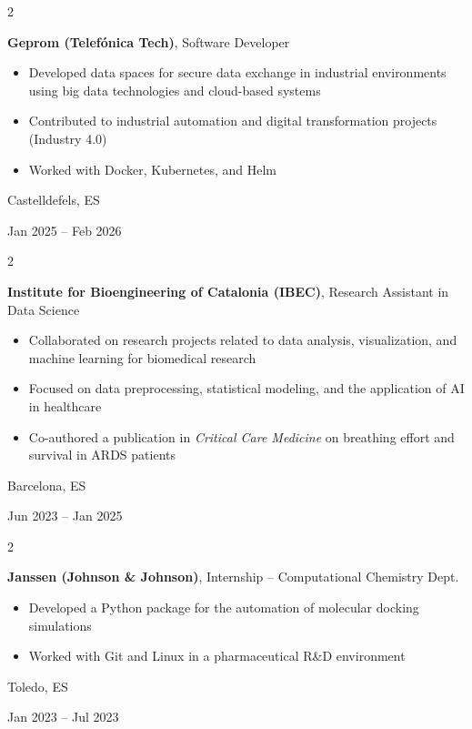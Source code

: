 \documentclass[10pt, letterpaper]{article}
\newenvironment{highlights}{
    \begin{itemize}[
        topsep=0.10 cm,
        parsep=0.10 cm,
        partopsep=0pt,
        itemsep=0pt,
        leftmargin=0.4 cm + 10pt
    ]
}{
    \end{itemize}
} %
\newenvironment{twocolentry}[2][]{
    \onecolentry
    \def\secondColumn{#2}
    \setcolumnwidth{\fill, 4.5 cm}
    \begin{paracol}{2}
}{
    \switchcolumn \raggedleft \secondColumn
    \end{paracol}
    \endonecolentry
} %
\begin{document}
        \vspace{0.2 cm}

        \begin{twocolentry}{
            Castelldefels, ES

            Jan 2025 -- Feb 2026
        }
            \textbf{Geprom (Telefónica Tech)}, Software Developer
            \begin{highlights}
                \item Developed data spaces for secure data exchange in industrial environments using big data technologies and cloud-based systems
                \item Contributed to industrial automation and digital transformation projects (Industry 4.0)
                \item Worked with Docker, Kubernetes, and Helm
            \end{highlights}
        \end{twocolentry}

        \vspace{0.2 cm}

        \begin{twocolentry}{
            Barcelona, ES

            Jun 2023 -- Jan 2025
        }
            \textbf{Institute for Bioengineering of Catalonia (IBEC)}, Research Assistant in Data Science
            \begin{highlights}
                \item Collaborated on research projects related to data analysis, visualization, and machine learning for biomedical research
                \item Focused on data preprocessing, statistical modeling, and the application of AI in healthcare
                \item Co-authored a publication in \textit{Critical Care Medicine} on breathing effort and survival in ARDS patients
            \end{highlights}
        \end{twocolentry}

        \vspace{0.2 cm}

        \begin{twocolentry}{
            Toledo, ES

            Jan 2023 -- Jul 2023
        }
            \textbf{Janssen (Johnson \& Johnson)}, Internship -- Computational Chemistry Dept.
            \begin{highlights}
                \item Developed a Python package for the automation of molecular docking simulations
                \item Worked with Git and Linux in a pharmaceutical R\&D environment
            \end{highlights}
        \end{twocolentry}
\end{document}
